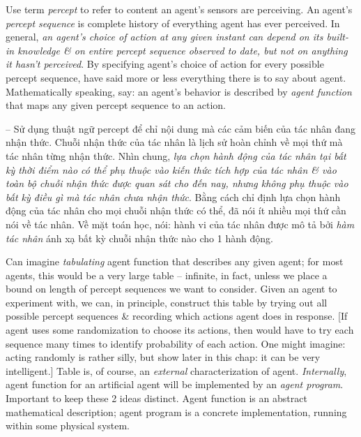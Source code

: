\documentclass{article}
\begin{document}
\begin{itemize}
\begin{itemize}
\begin{itemize}
			Use term {\it percept} to refer to content an agent's sensors are perceiving. An agent's {\it percept sequence} is complete history of everything agent has ever perceived. In general, {\it an agent's choice of action at any given instant can depend on its built-in knowledge \& on entire percept sequence observed to date, but not on anything it hasn't perceived}. By specifying agent's choice of action for every possible percept sequence, have said more or less everything there is to say about agent. Mathematically speaking, say: an agent's behavior is described by {\it agent function} that maps any given percept sequence to an action.

			-- Sử dụng thuật ngữ percept để chỉ nội dung mà các cảm biến của tác nhân đang nhận thức. Chuỗi nhận thức của tác nhân là lịch sử hoàn chỉnh về mọi thứ mà tác nhân từng nhận thức. Nhìn chung, {\it lựa chọn hành động của tác nhân tại bất kỳ thời điểm nào có thể phụ thuộc vào kiến thức tích hợp của tác nhân \& vào toàn bộ chuỗi nhận thức được quan sát cho đến nay, nhưng không phụ thuộc vào bất kỳ điều gì mà tác nhân chưa nhận thức}. Bằng cách chỉ định lựa chọn hành động của tác nhân cho mọi chuỗi nhận thức có thể, đã nói ít nhiều mọi thứ cần nói về tác nhân. Về mặt toán học, nói: hành vi của tác nhân được mô tả bởi {\it hàm tác nhân} ánh xạ bất kỳ chuỗi nhận thức nào cho 1 hành động.

			Can imagine {\it tabulating} agent function that describes any given agent; for most agents, this would be a very large table -- infinite, in fact, unless we place a bound on length of percept sequences we want to consider. Given an agent to experiment with, we can, in principle, construct this table by trying out all possible percept sequences \& recording which actions agent does in response. [If agent uses some randomization to choose its actions, then would have to try each sequence many times to identify probability of each action. One might imagine: acting randomly is rather silly, but show later in this chap: it can be very intelligent.] Table is, of course, an {\it external} characterization of agent. {\it Internally}, agent function for an artificial agent will be implemented by an {\it agent program}. Important to keep these 2 ideas distinct. Agent function is an abstract mathematical description; agent program is a concrete implementation, running within some physical system.


\end{itemize}
\end{itemize}
\end{itemize}
\end{document}
